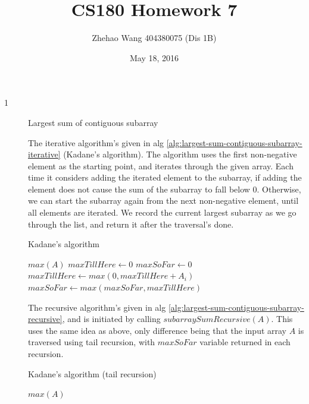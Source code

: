 \documentclass{article}
\title{CS180 Homework 7}
\author{Zhehao Wang 404380075 (Dis 1B)}
\date{May 18, 2016}
\begin{document}
\maketitle

\begin{description}

\item[1]{Largest sum of contiguous subarray}
  
  The iterative algorithm's given in alg \ref{alg:largest-sum-contiguous-subarray-iterative} (Kadane's algorithm). The algorithm uses the first non-negative element as the starting point, and iterates through the given array. Each time it considers adding the iterated element to the subarray, if adding the element does not cause the sum of the subarray to fall below 0. Otherwise, we can start the subarray again from the next non-negative element, until all elements are iterated. We record the current largest subarray as we go through the list, and return it after the traversal's done.

  \begin{algorithm}[H]
  \caption{Kadane's algorithm}
  \label{alg:largest-sum-contiguous-subarray-iterative}
    \begin{algorithmic}[1]
    
        \State \Return $max(A)$
      \EndIf
      \State $maxTillHere \gets 0$
      \State $maxSoFar \gets 0$
        \State $maxTillHere \gets max(0, maxTillHere + A_i)$
        \State $maxSoFar \gets max(maxSoFar, maxTillHere)$
      \EndFor
      \State {}
    \EndFunction

    \end{algorithmic}
  \end{algorithm}

  The recursive algorithm's given in alg \ref{alg:largest-sum-contiguous-subarray-recursive}, and is initiated by calling $subarraySumRecursive(A)$. This uses the same idea as above, only difference being that the input array $A$ is traversed using tail recursion, with $maxSoFar$ variable returned in each recursion.

  \begin{algorithm}[H]
  \caption{Kadane's algorithm (tail recursion)}
  \label{alg:largest-sum-contiguous-subarray-recursive}
    \begin{algorithmic}[1]

        \State \Return $max(A)$
      \EndIf


\end{algorithmic}
\end{algorithm}
\end{description}
\end{document}
